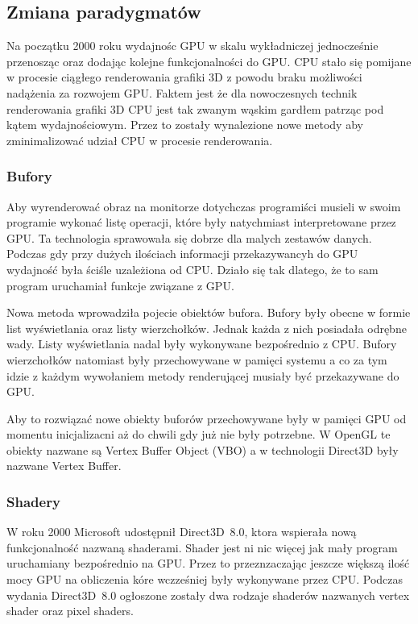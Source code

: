 \subsection{Zmiana paradygmatów}
\thispagestyle{empty}
\par\indent

Na początku 2000 roku wydajnośc GPU w skalu wykładniczej jednocześnie przenosząc oraz dodając kolejne funkcjonalności do GPU. CPU stało się pomijane w procesie ciągłego renderowania grafiki 3D z powodu braku możliwości nadążenia za rozwojem GPU. Faktem jest że dla nowoczesnych technik renderowania grafiki 3D CPU jest tak zwanym wąskim gardłem patrząc pod kątem wydajnościowym. Przez to zostały wynalezione nowe metody aby zminimalizować udział CPU w procesie renderowania.

\subsubsection{Bufory}
\thispagestyle{empty}
\par\indent

Aby wyrenderować obraz na monitorze dotychczas programiści musieli w swoim programie wykonać listę operacji, które były natychmiast interpretowane przez GPU. Ta technologia sprawowała się dobrze dla malych zestawów danych. Podczas gdy przy dużych ilościach informacji przekazywancyh do GPU wydajność była ściśle uzależiona od CPU. Działo się tak dlatego, że to sam program uruchamiał funkcje związane z GPU.

Nowa metoda wprowadziła pojecie obiektów bufora. Bufory były obecne w formie list wyświetlania oraz listy wierzchołków. Jednak każda z nich posiadała odrębne wady. Listy wyświetlania nadal były wykonywane bezpośrednio z CPU. Bufory wierzchołków natomiast były przechowywane w pamięci systemu a co za tym idzie z każdym wywołaniem metody renderującej musiały być przekazywane do GPU.

Aby to rozwiązać nowe obiekty buforów przechowywane były w pamięci GPU od momentu inicjalizacni aż do chwili gdy już nie były potrzebne. W OpenGL te obiekty nazwane są Vertex Buffer Object (VBO) a w technologii Direct3D były nazwane Vertex Buffer.

\subsubsection{Shadery}
\thispagestyle{empty}
\par\indent

W roku 2000 Microsoft udostępnił Direct3D~8.0, ktora wspierała nową funkcjonalność nazwaną shaderami. Shader jest ni nic więcej jak mały program uruchamiany bezpośrednio na GPU. Przez to przeznzaczając jeszcze większą ilość mocy GPU na obliczenia kóre wczześniej były wykonywane przez CPU. Podczas wydania Direct3D~8.0 ogłoszone zostały dwa rodzaje shaderów nazwanych vertex shader oraz pixel shaders.

